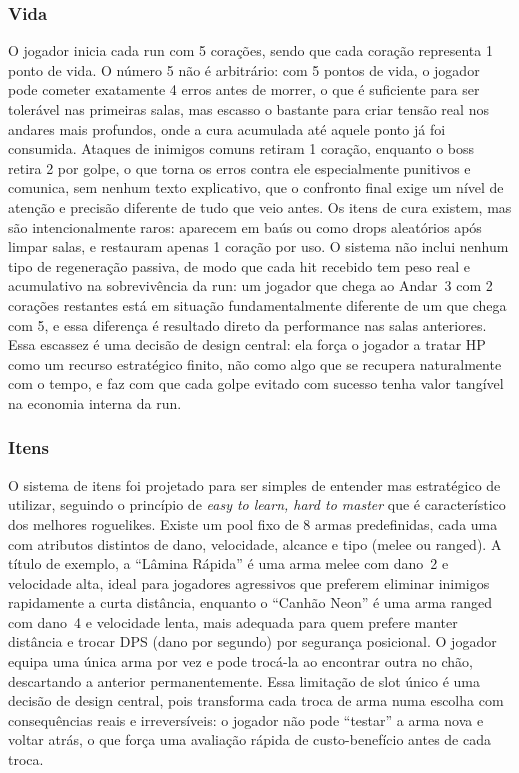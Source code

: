 \documentclass[12pt, a4paper]{article}
\begin{document}
\subsubsection{Vida}

O jogador inicia cada run com 5 cora\c{c}\~oes, sendo que cada cora\c{c}\~ao representa 1 ponto de vida. O n\'umero 5 n\~ao \'e arbitr\'ario: com 5 pontos de vida, o jogador pode cometer exatamente 4 erros antes de morrer, o que \'e suficiente para ser toler\'avel nas primeiras salas, mas escasso o bastante para criar tens\~ao real nos andares mais profundos, onde a cura acumulada at\'e aquele ponto j\'a foi consumida. Ataques de inimigos comuns retiram 1 cora\c{c}\~ao, enquanto o boss retira 2 por golpe, o que torna os erros contra ele especialmente punitivos e comunica, sem nenhum texto explicativo, que o confronto final exige um n\'ivel de aten\c{c}\~ao e precis\~ao diferente de tudo que veio antes. Os itens de cura existem, mas s\~ao intencionalmente raros: aparecem em ba\'us ou como drops aleat\'orios ap\'os limpar salas, e restauram apenas 1 cora\c{c}\~ao por uso. O sistema n\~ao inclui nenhum tipo de regenera\c{c}\~ao passiva, de modo que cada hit recebido tem peso real e acumulativo na sobreviv\^encia da run: um jogador que chega ao Andar~3 com 2 cora\c{c}\~oes restantes est\'a em situa\c{c}\~ao fundamentalmente diferente de um que chega com 5, e essa diferen\c{c}a \'e resultado direto da performance nas salas anteriores. Essa escassez \'e uma decis\~ao de design central: ela for\c{c}a o jogador a tratar HP como um recurso estrat\'egico finito, n\~ao como algo que se recupera naturalmente com o tempo, e faz com que cada golpe evitado com sucesso tenha valor tang\'ivel na economia interna da run.

\subsubsection{Itens}

O sistema de itens foi projetado para ser simples de entender mas estrat\'egico de utilizar, seguindo o princ\'ipio de \textit{easy to learn, hard to master} que \'e caracter\'istico dos melhores roguelikes. Existe um pool fixo de 8 armas predefinidas, cada uma com atributos distintos de dano, velocidade, alcance e tipo (melee ou ranged). A t\'itulo de exemplo, a ``L\^amina R\'apida'' \'e uma arma melee com dano~2 e velocidade alta, ideal para jogadores agressivos que preferem eliminar inimigos rapidamente a curta dist\^ancia, enquanto o ``Canh\~ao Neon'' \'e uma arma ranged com dano~4 e velocidade lenta, mais adequada para quem prefere manter dist\^ancia e trocar DPS (dano por segundo) por seguran\c{c}a posicional. O jogador equipa uma \'unica arma por vez e pode troc\'a-la ao encontrar outra no ch\~ao, descartando a anterior permanentemente. Essa limita\c{c}\~ao de slot \'unico \'e uma decis\~ao de design central, pois transforma cada troca de arma numa escolha com consequ\^encias reais e irrevers\'iveis: o jogador n\~ao pode ``testar'' a arma nova e voltar atr\'as, o que for\c{c}a uma avalia\c{c}\~ao r\'apida de custo-benef\'icio antes de cada troca.
\end{document}
